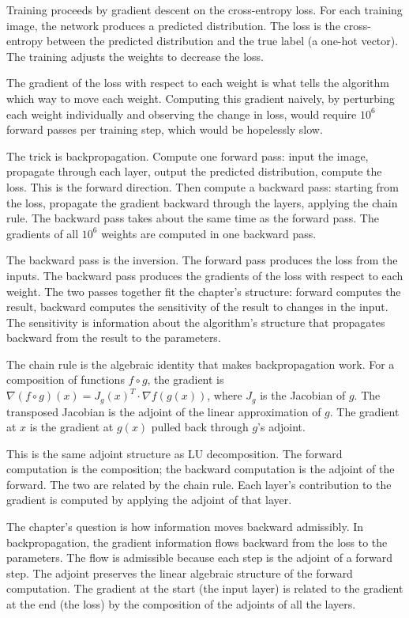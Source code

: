 Training proceeds by gradient descent on the cross-entropy loss. For
each training image, the network produces a predicted distribution.
The loss is the cross-entropy between the predicted distribution and
the true label (a one-hot vector). The training adjusts the weights
to decrease the loss.

The gradient of the loss with respect to each weight is what tells
the algorithm which way to move each weight. Computing this gradient
naively, by perturbing each weight individually and observing the
change in loss, would require $10^6$ forward passes per training step,
which would be hopelessly slow.

The trick is backpropagation. Compute one forward pass: input the
image, propagate through each layer, output the predicted
distribution, compute the loss. This is the forward direction. Then
compute a backward pass: starting from the loss, propagate the
gradient backward through the layers, applying the chain rule. The
backward pass takes about the same time as the forward pass. The
gradients of all $10^6$ weights are computed in one backward pass.

The backward pass is the inversion. The forward pass produces the
loss from the inputs. The backward pass produces the gradients of
the loss with respect to each weight. The two passes together fit
the chapter's structure: forward computes the result, backward
computes the sensitivity of the result to changes in the input. The
sensitivity is information about the algorithm's structure that
propagates backward from the result to the parameters.

The chain rule is the algebraic identity that makes
backpropagation work. For a composition of functions $f \circ g$,
the gradient is $\nabla(f \circ g)(x) = J_g(x)^T \cdot \nabla
f(g(x))$, where $J_g$ is the Jacobian of $g$. The transposed
Jacobian is the adjoint of the linear approximation of $g$. The
gradient at $x$ is the gradient at $g(x)$ pulled back through
$g$'s adjoint.

This is the same adjoint structure as LU decomposition. The
forward computation is the composition; the backward computation
is the adjoint of the forward. The two are related by the chain
rule. Each layer's contribution to the gradient is computed by
applying the adjoint of that layer.

The chapter's question is how information moves backward
admissibly. In backpropagation, the gradient information flows
backward from the loss to the parameters. The flow is admissible
because each step is the adjoint of a forward step. The adjoint
preserves the linear algebraic structure of the forward
computation. The gradient at the start (the input layer) is
related to the gradient at the end (the loss) by the
composition of the adjoints of all the layers.

